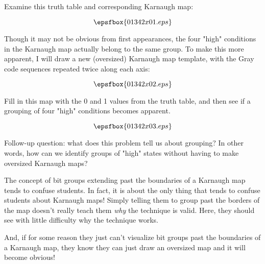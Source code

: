 

Examine this truth table and corresponding Karnaugh map:

$$\epsfbox{01342x01.eps}$$

Though it may not be obvious from first appearances, the four "high" conditions in the Karnaugh map actually belong to the same group.  To make this more apparent, I will draw a new (oversized) Karnaugh map template, with the Gray code sequences repeated twice along each axis:

$$\epsfbox{01342x02.eps}$$

Fill in this map with the 0 and 1 values from the truth table, and then see if a grouping of four "high" conditions becomes apparent.







$$\epsfbox{01342x03.eps}$$

\vskip 10pt

Follow-up question: what does this problem tell us about grouping?  In other words, how can we identify groups of "high" states without having to make oversized Karnaugh maps?







The concept of bit groups extending past the boundaries of a Karnaugh map tends to confuse students.  In fact, it is about the only thing that tends to confuse students about Karnaugh maps!  Simply telling them to group past the borders of the map doesn't really teach them {\it why} the technique is valid.  Here, they should see with little difficulty why the technique works.

And, if for some reason they just can't visualize bit groups past the boundaries of a Karnaugh map, they know they can just draw an oversized map and it will become obvious!




